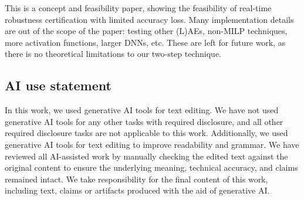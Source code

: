 \documentclass{article} %
\begin{document}
This is a concept and feasibility paper,
showing the feasibility of real-time robustness certification with limited accuracy loss.
Many implementation details are out of the scope of the paper: testing other (L)AEs, non-MILP techniques, more activation functions, larger DNNs, etc. These are left for future work, as there is no theoretical limitations to our two-step technique.


\newpage



\subsection*{AI use statement}



In this work, we used generative AI tools for text editing. We have not used generative AI tools for any other tasks with required disclosure, and all other required disclosure tasks are not applicable to this work. Additionally, we used generative AI tools for text editing to improve readability and grammar. We have reviewed all AI-assisted work by manually checking the edited text against the original content to ensure the underlying meaning, technical accuracy, and claims remained intact. We take responsibility for the final content of this work, including text, claims or artifacts produced with the aid of generative AI.

\end{document}
